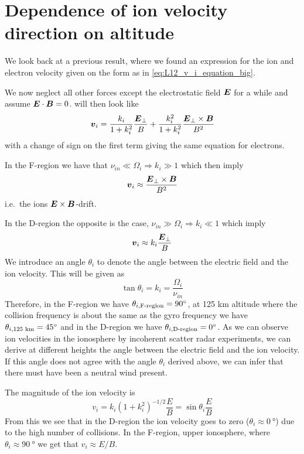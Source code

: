 \section{Dependence of ion velocity direction on altitude}
We look back at a previous result, where we found an expression for the ion and electron velocity given on the form as in \cref{eq:L12_v_i_equation_big}.

We now neglect all other forces except the electrostatic field \(\boldsymbol{E}\) for a while and assume \(\boldsymbol{E}\cdot\boldsymbol{B}=0\).  will then look like
\begin{equation*}
    \boldsymbol{v}_i=\frac{k_i}{1+k_i^2}\frac{\boldsymbol{E}_\perp}{B}+\frac{k_i^2}{1+k_i^2}\frac{\boldsymbol{E}_\perp\times\boldsymbol{B}}{B^2}
\end{equation*}
with a change of sign on the first term giving the same equation for electrons.

In the F-region we have that \(\nu_{in}\ll\Omega_i\Rightarrow k_i\gg 1\) which then imply
\begin{equation*}
    \boldsymbol{v}_i\approx\frac{\boldsymbol{E}_\perp\times\boldsymbol{B}}{B^2}
\end{equation*}
i.e.\ the ions \(\boldsymbol{E}\times\boldsymbol{B}\)-drift.

In the D-region the opposite is the case, \(\nu_{in}\gg\Omega_i\Rightarrow k_i\ll 1\) which imply
\begin{equation*}
    \boldsymbol{v}_i\approx k_i\frac{\boldsymbol{E}_\perp}{B}
\end{equation*}
We introduce an angle \(\theta_i\) to denote the angle between the electric field and the ion velocity. This will be given as
\begin{equation*}
    \tan\theta_i=k_i=\frac{\Omega_i}{\nu_{in}}
\end{equation*}
Therefore, in the F-region we have \(\theta_{i,\tn{F-region}}=\SI{90}{\degree}\), at 125 km altitude where the collision frequency is about the same as the gyro frequency we have \(\theta_{i,\tn{125 km}}=\SI{45}{\degree}\) and in the D-region we have \(\theta_{i,\tn{D-region}}=\SI{0}{\degree}\). As we can observe ion velocities in the ionosphere by incoherent scatter radar experiments, we can derive at different heights the angle between the electric field and the ion velocity. If this angle does not agree with the angle \(\theta_i\) derived above, we can infer that there must have been a neutral wind present.

The magnitude of the ion velocity is
\begin{equation*}
    v_i=k_i{\left(1+k_i^2\right)}^{-1/2}\frac{E}{B}=\sin\theta_i\frac{E}{B}
\end{equation*}
From this we see that in the D-region the ion velocity goes to zero (\(\theta_i\approx\SI{0}{\degree}\)) due to the high number of collisions. In the F-region, upper ionosphere, where \(\theta_i\approx\SI{90}{\degree}\) we get that \(v_i\approx E/B\).

